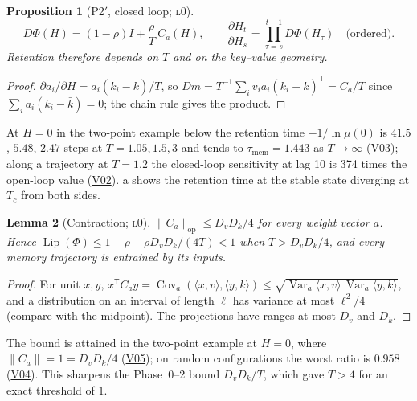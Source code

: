 \documentclass[11pt]{article}
\newtheorem{proposition}{Proposition}
\newtheorem{lemma}[proposition]{Lemma}
\theoremstyle{definition}
\theoremstyle{remark}
\newcommand{\Cov}{\operatorname{Cov}}
\newcommand{\Var}{\operatorname{Var}}
\newcommand{\Lip}{\operatorname{Lip}}
\newcommand{\lvl}[1]{\textsc{l}#1}
\newcommand{\V}[1]{\hyperref[app:verify]{\textsf{#1}}}
\begin{document}
\begin{proposition}[P2$'$, closed loop; \lvl{0}]\label{prop:P2prime}
\[
D\Phi(H)=(1-\rho)I+\frac{\rho}{T}\,C_a(H),\qquad \frac{\partial H_t}{\partial H_s}=\prod_{\tau=s}^{t-1}D\Phi(H_\tau)\quad\text{(ordered)}.
\]
Retention therefore depends on $T$ and on the key--value geometry.
\end{proposition}
\begin{proof}
$\partial a_i/\partial H=a_i(k_i-\bar k)/T$, so $Dm=T^{-1}\sum_iv_i a_i(k_i-\bar k)^{\mathsf T}=C_a/T$ since $\sum_ia_i(k_i-\bar k)=0$; the chain rule gives the product.
\end{proof}
At $H=0$ in the two-point example below the retention time $-1/\ln\mu(0)$ is $41.5$, $5.48$, $2.47$ steps at $T=1.05,1.5,3$ and tends to $\tau_{\mathrm{mem}}=1.443$ as $T\to\infty$ (\V{V03}); along a trajectory at $T=1.2$ the closed-loop sensitivity at lag 10 is 374 times the open-loop value (\V{V02}). a shows the retention time at the stable state diverging at $T_c$ from both sides.

\begin{lemma}[Contraction; \lvl{0}]\label{lem:popoviciu}
$\lVert C_a\rVert_{\mathrm{op}}\le D_vD_k/4$ for every weight vector $a$. Hence $\Lip(\Phi)\le1-\rho+\rho D_vD_k/(4T)<1$ when $T>D_vD_k/4$, and every memory trajectory is entrained by its inputs.
\end{lemma}
\begin{proof}
For unit $x,y$, $x^{\mathsf T}C_ay=\Cov_a(\langle x,v\rangle,\langle y,k\rangle)\le\sqrt{\Var_a\langle x,v\rangle\,\Var_a\langle y,k\rangle}$, and a distribution on an interval of length $\ell$ has variance at most $\ell^2/4$ (compare with the midpoint). The projections have ranges at most $D_v$ and $D_k$.
\end{proof}
The bound is attained in the two-point example at $H=0$, where $\lVert C_a\rVert=1=D_vD_k/4$ (\V{V05}); on random configurations the worst ratio is $0.958$ (\V{V04}). This sharpens the Phase~0--2 bound $D_vD_k/T$, which gave $T>4$ for an exact threshold of $1$.
\end{document}
